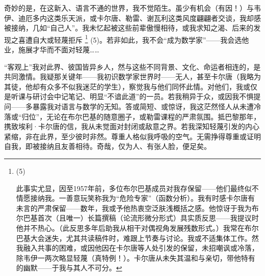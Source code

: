 奇妙的是，在这新入、语言不通的世界，我不觉陌生。虽少有机会（有因！）与韦伊、迪厄多内这类乐天派，或卡尔唐、勒雷、谢瓦利这类风度翩翩者交谈，我却感被接纳，几如“自己人”。我未忆起被这些前辈傲慢相待，或我求知之渴、后来的发现之喜遭自大或轻蔑拒斥 \footnote{(5)\par 此事实尤显，因至1957年前，多位布尔巴基成员对我存保留——他们最终似不情愿接纳我。一善意玩笑称我为“危险专家”（函数分析）。我有时感卡尔唐有未言的严肃保留——数年，我或予他热衷空泛肤浅概括之感。他惊讶于我为布尔巴基首次（且唯一）长篇撰稿（论流形微分形式）具实质反思——我提议时他并不热心。（此反思多年后助我从相干对偶视角发展残数形式。）我常在布尔巴基大会迷失，尤其共读稿件时，难跟上节奏与讨论。我或不适集体工作。然我融入共事的困难，或因他因在卡尔唐等人处引发的保留，未招嘲讽或冷落，除韦伊一两次略显轻蔑（真特例！）。卡尔唐从未失其温和与亲切，带他特有的幽默——于我与其人不可分。} (5)。若非如此，我不会“成为数学家”——我会选他业，施展才华而不面对轻蔑……

“客观上”我对此界、彼国皆异乡人，然与这些不同背景、文化、命运者相连的，是共同激情。我疑那关键年——我初识数学家世界时——无人，甚至卡尔唐（我略为其徒，他却有众多不似我迷茫的学生），察觉我与他们同怀此情。对他们，我或仅是听课与研讨会中记笔记、明显“不谙此道”的一员。若我稍异于众，或因我不惧提问——多暴露我对语言与数学的无知。答或简短、或惊讶，我这茫然怪人从未遭冷落或“归位”，无论在布尔巴基的随意圈子，或勒雷课程的严肃氛围。抵巴黎那年，携致埃利·卡尔唐的信，我从未觉面对封闭或敌意之界。若我深知轻蔑引发的内心紧缩，非在此界，至少彼时非然。尊重人格似我呼吸的空气。无需挣得尊重或证明自我，即被接纳且友善相待。奇哉，仅为人、有张人脸，便足矣。